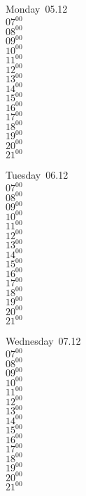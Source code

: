 \documentclass[11pt,a4paper]{book}\usepackage[]{graphicx}\usepackage[]{color}
\begin{document}
\begin{headerbox}
\end{headerbox}
\begin{weekdaybox}
  Monday~05.12\\
  { 
  \vfill
  $07^{00}$\\
$08^{00}$\\
$09^{00}$\\
$10^{00}$\\
$11^{00}$\\
$12^{00}$\\
$13^{00}$\\
$14^{00}$\\
$15^{00}$\\
$16^{00}$\\
$17^{00}$\\
$18^{00}$\\
$19^{00}$\\
$20^{00}$\\
$21^{00}$\\
  }
\end{weekdaybox}
\begin{weekdaybox}
  Tuesday~06.12\\
  { 
  \vfill
  $07^{00}$\\
$08^{00}$\\
$09^{00}$\\
$10^{00}$\\
$11^{00}$\\
$12^{00}$\\
$13^{00}$\\
$14^{00}$\\
$15^{00}$\\
$16^{00}$\\
$17^{00}$\\
$18^{00}$\\
$19^{00}$\\
$20^{00}$\\
$21^{00}$\\
  }
\end{weekdaybox}
\begin{weekdaybox}
  Wednesday~07.12\\
  { 
  \vfill
  $07^{00}$\\
$08^{00}$\\
$09^{00}$\\
$10^{00}$\\
$11^{00}$\\
$12^{00}$\\
$13^{00}$\\
$14^{00}$\\
$15^{00}$\\
$16^{00}$\\
$17^{00}$\\
$18^{00}$\\
$19^{00}$\\
$20^{00}$\\
$21^{00}$\\
  }
\end{weekdaybox}
\end{document}
